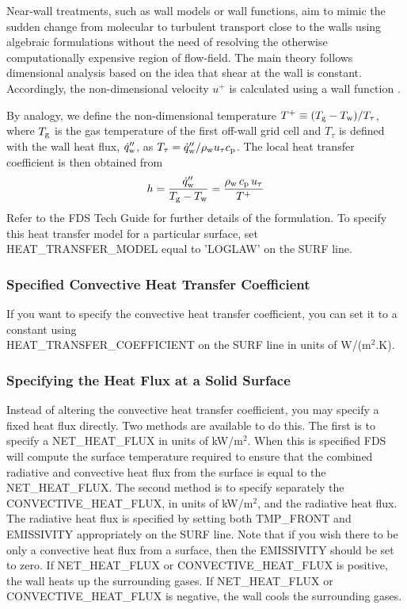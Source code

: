 \documentclass[11pt]{book}
\begin{document}
Near-wall treatments, such as wall models or wall functions, aim to mimic the sudden change from molecular to turbulent transport close to the walls using algebraic formulations without the need of resolving the otherwise computationally expensive region of flow-field. The main theory follows dimensional analysis based on the idea that shear at the wall is constant. Accordingly, the non-dimensional velocity $u^+$ is calculated using a wall function \cite{FDS_Tech_Guide}.

By analogy, we define the non-dimensional temperature $T^+ \equiv (T_{\rm g}-T_{\rm w})/T_\tau$, where $T_{\rm g}$ is the gas temperature of the first off-wall grid cell and $T_\tau$ is defined with the wall heat flux, $\dot{q}''_{\rm w}$, as $T_\tau = \dot{q}''_{\rm w}/\rho_{\rm w} u_\tau c_{\rm p}$. The local heat transfer coefficient is then obtained from
\begin{equation}
h = \frac{\dot{q}''_{\rm w}}{T_{\rm g}-T_{\rm w}} = \frac{\rho_{\rm w} \, c_{\rm p} \, u_\tau}{T^+}
\end{equation}
Refer to the FDS Tech Guide \cite{FDS_Tech_Guide} for further details of the formulation. To specify this heat transfer model for a particular
surface, set {\ct HEAT\_TRANSFER\_MODEL} equal to {\ct 'LOGLAW'} on the {\ct SURF} line.

\subsubsection{Specified Convective Heat Transfer Coefficient}

If you want to specify the convective heat transfer coefficient, you can set it to a constant using \\
{\ct HEAT\_TRANSFER\_COEFFICIENT} on the {\ct SURF} line in units of \si{W/(m$^2$.K)}.

\subsubsection{Specifying the Heat Flux at a Solid Surface}

Instead of altering the convective heat transfer coefficient, you may specify
a fixed heat flux directly.  Two methods are available to do this.  The first is to specify a
{\ct NET\_HEAT\_FLUX} in units of kW/m$^2$.  When this is specified FDS will compute the surface
temperature required to
ensure that the combined radiative and convective heat flux from the surface is equal to the
{\ct NET\_HEAT\_FLUX}.  The second method is to specify separately the {\ct CONVECTIVE\_HEAT\_FLUX},
in units of kW/m$^2$, and the radiative heat flux.  The radiative heat flux is specified  by setting both
{\ct TMP\_FRONT} and {\ct EMISSIVITY} appropriately on the {\ct SURF} line. Note that if you wish there to be only a convective heat flux from a
surface, then the {\ct EMISSIVITY} should be set to zero.  If {\ct NET\_HEAT\_FLUX} or
{\ct CONVECTIVE\_HEAT\_FLUX} is positive, the wall heats up the surrounding gases. If {\ct NET\_HEAT\_FLUX} or
{\ct CONVECTIVE\_HEAT\_FLUX} is negative, the wall cools the surrounding gases.
\end{document}

